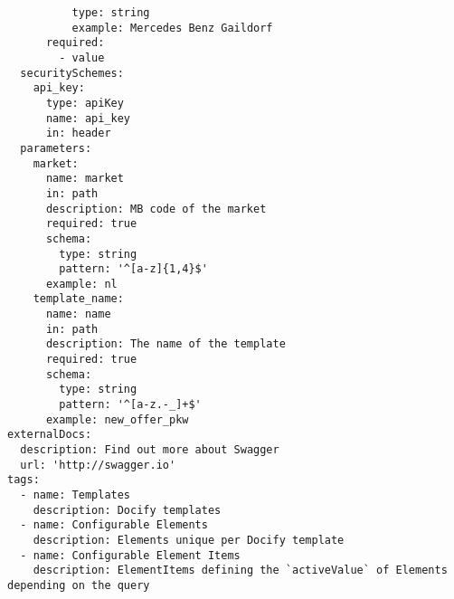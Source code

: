 \begin{lstlisting}
          type: string
          example: Mercedes Benz Gaildorf
      required:
        - value
  securitySchemes:
    api_key:
      type: apiKey
      name: api_key
      in: header
  parameters:
    market:
      name: market
      in: path
      description: MB code of the market
      required: true
      schema:
        type: string
        pattern: '^[a-z]{1,4}$'
      example: nl
    template_name:
      name: name
      in: path
      description: The name of the template
      required: true
      schema:
        type: string
        pattern: '^[a-z.-_]+$'
      example: new_offer_pkw
externalDocs:
  description: Find out more about Swagger
  url: 'http://swagger.io'
tags:
  - name: Templates
    description: Docify templates
  - name: Configurable Elements
    description: Elements unique per Docify template
  - name: Configurable Element Items
    description: ElementItems defining the `activeValue` of Elements depending on the query
\end{lstlisting}
